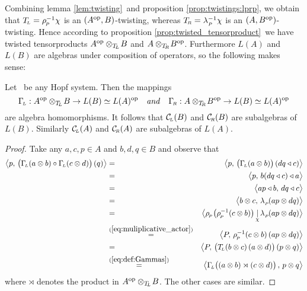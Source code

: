 Combining lemma \ref{lem:twisting}\ and proposition \ref{prop:twistings:lprp},
we obtain that $\TL=\rp^{-1}\flip$ is an $(A\op,B)$-twisting, whereas
$\TR=\lp^{-1}\flip$ is an $(A,B\op)$-twisting.
Hence according to proposition \ref{prop:twisted_tensorproduct}\
we have twisted tensorproducts $A\op\tens_{\TL}\! B$ and $A\tens_{\TR}\! B\op$.
Furthermore $L(A)$ and $L(B)$ are algebras under composition of operators,
so the following makes sense:


\begin{prop}
Let\/ \pairAB\ be any Hopf system. Then the mappings
$$ \GamL :  A\op\tens_{\TL}\! B  \rarr  L(B)\simeq L(A)\op
   \itandspace{1em}
   \GamR :  A\tens_{\TR}\! B\op  \rarr  L(B)\simeq L(A)\op $$
are algebra homomorphisms.
It follows that\/ $\CL(B)$ and\/ $\CR(B)$ are subalgebras of\/ $L(B)$.
Similarly\/ $\CL(A)$ and\/ $\CR(A)$ are subalgebras of\/ $L(A)$.
\end{prop}
\begin{proof}
Take any $a,c,p\in A$ and $b,d,q\in B$ and observe that
\begin{eqnarray*}
\pairM{p}{\left( \GamL(a \tens b) \circ \GamL(c \tens d) \vertM\right)(q)}
&=&
\pairM{p}{\left( \GamL(a \tens b) \vertM\right)(dq \ract c)}
\\&=&
\pairM{p}{b(dq \ract c) \ract a}
\\&=&
\pairM{ap \ract b}{dq \ract c}
\\&=&
\pairM{b\tens c}{\lp(ap \tens dq)}
\\&=&
\pairflipM{\rp\! \left(\rp^{-1}(c \tens b) \vertM\right)}{\lp(ap \tens dq)}
\\&\stackrel{(\ref{eq:muliplicative_actor})}{=}&
\pairM{P}{\rp^{-1}(c \tens b) \, (ap \tens dq)}
\\&=&
\pairM{P}{\left(\TL(b \tens c) \, (a \tens d) \vertM\right) (p \tens q)}
\\&\stackrel{(\ref{eq:def:Gammas})}{=}&
\pairM{\GamL\! \left((a \tens b) \rtimes (c \tens d) \vertM\right)}{p \tens q}
\end{eqnarray*}
where $\rtimes$ denotes the product in $A\op\tens_{\TL}\! B$.
The other cases are similar.
\end{proof}
\vspace{2ex}


